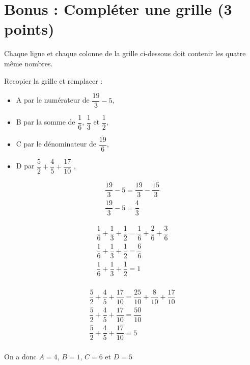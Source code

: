 \section{Bonus : Compléter une grille (3 points)}

Chaque ligne et chaque colonne  de la grille ci-dessous doit contenir les quatre même nombres.

	\begin{questions}
		\question[1] Recopier la grille et remplacer :
		
		\begin{itemize}
			\item A par le numérateur de $\dfrac{19}{3} - 5$,
			\item B par la somme de $\dfrac{1}{6}$, $\dfrac{1}{3}$ et $\dfrac{1}{2}$,
			\item C par le dénominateur de $\dfrac{19}{6}$,
			\item D par $\dfrac{5}{2} + \dfrac{4}{5} + \dfrac{17}{10}$ ,
		\end{itemize}
	
		\begin{solution}
			\begin{eqnarray*}
				\dfrac{19}{3} - 5 = \dfrac{19}{3} - \dfrac{15}{3} \\
				\dfrac{19}{3} - 5 = \dfrac{4}{3}
 			\end{eqnarray*}
 		
 			\begin{eqnarray*}
 				\dfrac{1}{6} + \dfrac{1}{3} + \dfrac{1}{2} = \dfrac{1}{6} + \dfrac{2}{6} + \dfrac{3}{6}\\
 				\dfrac{1}{6} + \dfrac{1}{3} + \dfrac{1}{2} = \dfrac{6}{6} \\
 				\dfrac{1}{6} + \dfrac{1}{3} + \dfrac{1}{2} = 1 \\
 			\end{eqnarray*}
 		
 		
 			\begin{eqnarray*}
 				\dfrac{5}{2} + \dfrac{4}{5} + \dfrac{17}{10} = \dfrac{25}{10} + \dfrac{8}{10} + \dfrac{17}{10}\\
 				\dfrac{5}{2} + \dfrac{4}{5} + \dfrac{17}{10} = \dfrac{50}{10} \\
 				\dfrac{5}{2} + \dfrac{4}{5} + \dfrac{17}{10} = 5 \\
 			\end{eqnarray*}
 		
 		On a donc $A=4$, $B=1$, $C=6$ et $D=5$
		\end{solution}
	

\end{questions}
